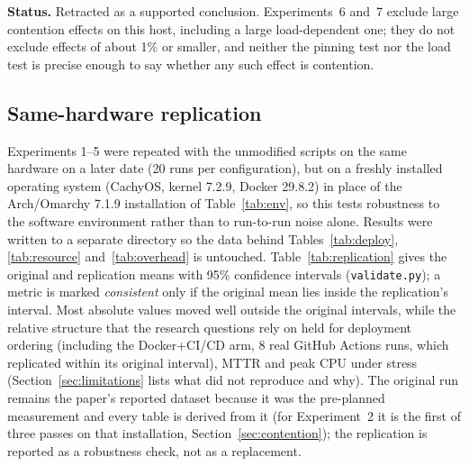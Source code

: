 \documentclass[conference]{IEEEtran}
\begin{document}
\textbf{Status.} Retracted as a supported conclusion. Experiments~6 and~7 exclude
large contention effects on this host, including a large load-dependent one; they do
not exclude effects of about 1\% or smaller, and neither the pinning test nor the
load test is precise enough to say whether any such effect is contention.

\subsection{Same-hardware replication}
\label{sec:replication}
Experiments 1--5 were repeated with the unmodified scripts on the same
hardware on a later date (20 runs per configuration), but on a freshly
installed operating system (CachyOS, kernel 7.2.9, Docker 29.8.2) in place of
the Arch/Omarchy 7.1.9 installation of Table~\ref{tab:env}, so this tests
robustness to the software environment rather than to run-to-run noise alone.
Results were written to a separate directory so
the data behind Tables~\ref{tab:deploy}, \ref{tab:resource}
and~\ref{tab:overhead} is untouched. Table~\ref{tab:replication} gives
the original and replication means with 95\% confidence intervals
(\texttt{validate.py}); a metric is marked \emph{consistent} only if the
original mean lies inside the replication's interval. Most absolute values
moved well outside the original intervals, while the relative structure that
the research questions rely on held for deployment ordering (including the
Docker+CI/CD arm, 8 real GitHub Actions runs, which replicated within its
original interval), MTTR and peak CPU under stress (Section~\ref{sec:limitations} lists what did not reproduce and
why). The original run remains the paper's reported dataset because it was the
pre-planned measurement and every table is derived from it (for Experiment~2 it is
the first of three passes on that installation, Section~\ref{sec:contention}); the replication is
reported as a robustness check, not as a replacement.

\begin{table}[t]
\centering
\caption{Original vs.\ same-hardware replication on a reinstalled OS (20 runs each). Intervals are
$t$-based 95\% CIs on the mean (sample SD); $\Delta$\% is replication relative
to original. The Experiment~4 rows are from the unmodified zero-filled script
(0/20 OOM kills, see Section~\ref{sec:limitations}); the non-zero-fill rows come
from the variant that kills the container. A row is \emph{consistent} only if the
original mean lies inside the replication's interval. This rule is strict when
the replication runs are nearly identical (5 requests and 11.06\,s in every
non-zero-fill run), so those rows read \emph{different} although the values are
within one request, 1\,MB and 0.5\,s of the original. The CPU\% rows marked
consistent rest on the bimodal measurement discussed in
Section~\ref{sec:limitations}. Experiment~6 has no original run and is not in
this table. Generated from \texttt{results/original\_vs\_replication.csv}.}
\label{tab:replication}
\scriptsize

\end{table}
\end{document}
